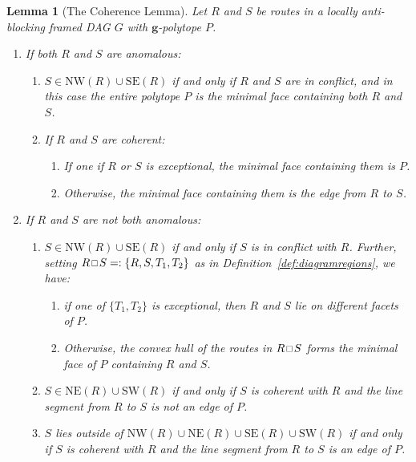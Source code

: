 \documentclass[10pt,a4paper]{amsart}
\newtheorem{lemma}{Lemma}
\newcommand\NE{\mathrm{NE}}
\newcommand\NW{\mathrm{NW}}
\newcommand\SE{\mathrm{SE}}
\newcommand\SW{\mathrm{SW}}
\newcommand\bg{\mathbf{g}}
\newcommand\squarette{\scalebox{0.75}{\hbox{$\,\square\,$}}}
\begin{document}
\begin{lemma}[The Coherence Lemma]\label{lem:thecoherencelemma}
    Let $R$ and $S$ be routes in a locally anti-blocking framed DAG $G$ with $\bg$-polytope $P$.
    \begin{enumerate}[label=(\roman*)]

    \item If both $R$ and $S$ are anomalous:
    \begin{enumerate}
        \item $S\in \NW(R)\cup \SE(R)$ if and only if $R$ and $S$ are in conflict, and in this case the entire polytope $P$ is the minimal face containing both $R$ and $S$. 
        \item If $R$ and $S$ are coherent:
        \begin{enumerate}
            \item If one if $R$ or $S$ is exceptional, the minimal face containing them is $P$.
            \item Otherwise, the minimal face containing them is the edge from $R$ to $S$.
        \end{enumerate}
    \end{enumerate}
    \item If $R$ and $S$ are not both anomalous:
    \begin{enumerate}
        \item $S\in \NW(R) \cup \SE(R)$ if and only if $S$ is in conflict with $R$.
        Further, setting $R\squarette  S =: \{R, S, T_1, T_2\}$ as in Definition~\ref{def:diagramregions}, we have:
    \begin{enumerate}
        \item if one of $\{T_1,T_2\}$ is exceptional, then $R$ and $S$ lie on different facets of $P$.
        \item Otherwise, the convex hull of the routes in $R\squarette  S$ forms the minimal face of $P$ containing $R$ and $S$.
        \end{enumerate}     
        \item $S \in \NE(R) \cup \SW(R)$ if and only if $S$ is coherent with $R$ and the line segment from $R$ to $S$ is not an edge of $P$.
        \item $S$ lies outside of $\NW(R)\cup \NE(R)\cup \SE(R)\cup \SW(R)$ if and only if $S$ is coherent with $R$ and the line segment from $R$ to $S$ is an edge of $P$.
    \end{enumerate}
    \end{enumerate}
\end{lemma}
\end{document}
